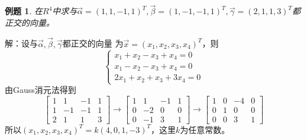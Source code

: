 \documentclass[a4paper]{book}
\newtheorem{eg}{例题}[chapter]
\begin{document}
\begin{eg}
在$R^4$中求与$\vec{\alpha}=(1,1,-1,1)^T,\vec{\beta}=(1,-1,-1,1)^T,
\vec{\gamma}=(2,1,1,3)^T$都正交的向量。
\end{eg}
解：设与$\vec{\alpha},\vec{\beta},\vec{\gamma}$都正交的向量
为$\vec{x}=(x_1,x_2,x_3,x_4)^T$，则
\begin{equation*}
\begin{cases}
x_1+x_2-x_3+x_4=0\\
x_1-x_2-x_3+x_4=0\\
2x_1+x_2+x_3+3x_4=0
\end{cases}
\end{equation*}
由Gauss消元法得到
\begin{equation*}
\begin{bmatrix}
1&1&-1&1\\1&-1&-1&1\\2&1&1&3
\end{bmatrix}
\rightarrow
\begin{bmatrix}
1&1&-1&1\\0&-2&0&0\\0&-1&3&1
\end{bmatrix}
\rightarrow
\begin{bmatrix}
1&0&-4&0\\0&1&0&0\\0&0&3&1
\end{bmatrix}
\end{equation*}
所以$(x_1,x_2,x_3,x_4)^T=k(4,0,1,-3)^T$，这里$k$为任意常数。
\end{document}
